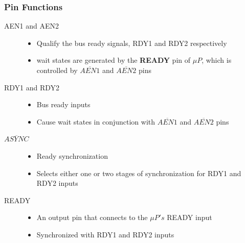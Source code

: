 \documentclass{article}
\begin{document}
\subsubsection{Pin Functions}
\begin{description}

  \item[AEN1 and AEN2]
  \begin{itemize}
    \item Qualify the bus ready signals, RDY1 and RDY2 respectively
    \item wait states are generated by the \textbf{READY} pin of $\mu P$, which is controlled
    by $\overline{AEN1}$ and $\overline{AEN2}$ pins
  \end{itemize}

  \item[RDY1 and RDY2]
  \begin{itemize}
    \item Bus ready inputs
    \item Cause wait states in conjunction with $\overline{AEN1}$ and $\overline{AEN2}$ pins
  \end{itemize}

  \item[$\overline{ASYNC}$]
  \begin{itemize}
    \item Ready synchronization
    \item Selects either one or two stages of synchronization for RDY1 and RDY2 inputs

  \end{itemize}

  \item[READY]
  \begin{itemize}
    \item An output pin that connects to the $\mu P's$ READY input
    \item Synchronized with RDY1 and RDY2 inputs
  \end{itemize}

\end{description}
\end{document}

